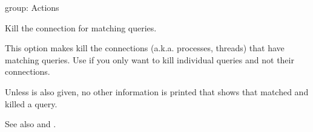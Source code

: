\documentclass[letterpaper,10pt,english]{sphinxmanual}
\begin{document}
\begin{fulllineitems}
\label{\detokenize{mariadb-kill:cmdoption-mariadb-kill-kill}}
group: Actions

Kill the connection for matching queries.

This option makes  kill the connections (a.k.a. processes, threads) that
have matching queries.  Use {\hyperref[\detokenize{mariadb-kill:cmdoption-mariadb-kill-kill-query}]{}} if you only want to kill
individual queries and not their connections.

Unless {\hyperref[\detokenize{mariadb-kill:cmdoption-mariadb-kill-print}]{}} is also given, no other information is printed that shows
that  matched and killed a query.

See also {\hyperref[\detokenize{mariadb-kill:cmdoption-mariadb-kill-wait-before-kill}]{}} and {\hyperref[\detokenize{mariadb-kill:cmdoption-mariadb-kill-wait-after-kill}]{}}.

\end{fulllineitems}

\end{document}
